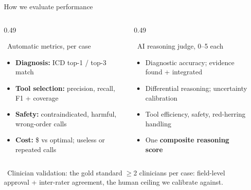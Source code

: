 \documentclass[aspectratio=169,t]{beamer}
\begin{document}
\begin{frame}{How we evaluate performance}
  \vspace{1mm}
  \begin{columns}[T,onlytextwidth]
    \begin{column}{0.49\textwidth}
      \begin{block}{{\color{CERNblue}\faCalculator}\;\, Automatic metrics, per case}
        \footnotesize
        \begin{itemize}\setlength\itemsep{0.15em}
          \item \textbf{Diagnosis:} ICD top-1 / top-3 match
          \item \textbf{Tool selection:} precision, recall, F1 + coverage
          \item \textbf{Safety:} contraindicated, harmful, wrong-order calls
          \item \textbf{Cost:} \$ vs optimal; useless or repeated calls
        \end{itemize}
      \end{block}
    \end{column}%
    \hfill
    \begin{column}{0.49\textwidth}
      \begin{alertblock}{{\color{CERNorange}\faGavel}\;\, AI reasoning judge, 0--5 each}
        \footnotesize
        \begin{itemize}\setlength\itemsep{0.15em}
          \item Diagnostic accuracy; evidence found + integrated
          \item Differential reasoning; uncertainty calibration
          \item Tool efficiency, safety, red-herring handling
          \item One \textbf{composite reasoning score}
        \end{itemize}
      \end{alertblock}
    \end{column}
  \end{columns}

  \vspace{1mm}
  \begin{exampleblock}{{\color{CERNcyan}\faUserMd}\;\, Clinician validation: the gold standard}
    \footnotesize
    $\geq$2 clinicians per case: field-level approval + inter-rater agreement, the human ceiling we calibrate against.
  \end{exampleblock}
\end{frame}
\end{document}
